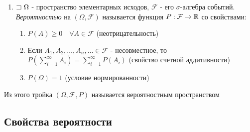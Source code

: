 \documentclass[12pt]{article}
\begin{document}
\begin{enumerate}
\begin{enumerate}
            \begin{tcolorbox}
                $\Box \quad$ $A, B \in \mathcal{F} \Longrightarrow A, \overline{B} \in \mathcal{F} \Longrightarrow A \setminus B = A \cdot \overline{B} \in \mathcal{F}$ $\quad \Box$
            \end{tcolorbox}

        \end{enumerate}

         $\mathcal{F} = \{\emptyset, \Omega\}$

         $\mathcal{F} = \{\emptyset, \Omega, A, \overline{A}\}$

         \Defs Борелевская $\sigma$-алгебра $\mathcal{B}(\Real)$ - минимальная $\sigma$-алгебра, содержащая все возможные интервалы на прямой


        \item \Defs $\mathord{\sqsupset}\ \Omega$ - пространство элементарных исходов, $\mathcal{F}$ - его $\sigma$-алгебра событий.
        \textit{Вероятностью} на $(\Omega, \mathcal{F})$ называется функция $P: \mathcal{F} \to \mathbb{R}$ со свойствами:

        \begin{enumerate}
            \item $P(A) \geq 0 \quad \forall A \in \mathcal{F}$ (неотрицательность)

            \item Если $A_1, A_2, \dots, A_n, \dots \in \mathcal{F}$ - несовместное, то $P(\sum_{i = 1}^\infty A_i) = \sum_{i = 1}^\infty P(A_i)$ (свойство счетной аддитивности)

            \item $P(\Omega) = 1$ (условие нормированности)
        \end{enumerate}

    \end{enumerate}

    \hypertarget{probabilityspace}{}

    \Def Из этого тройка $(\Omega, \mathcal{F}, P)$ называется вероятностным пространством

    \subsection{Свойства вероятности}

    \hypertarget{probabilityproperties}{}
\end{document}
